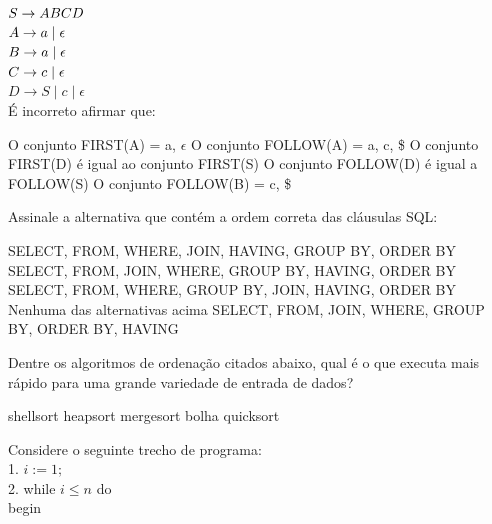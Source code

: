\documentclass[12pt, addpoints]{exam}
\begin{document}
\begin{questions}
$S \rightarrow ABCD \\$\\

$A \rightarrow a \mid \epsilon \\$\\

$B \rightarrow a \mid \epsilon \\$\\

$C \rightarrow c \mid \epsilon \\$\\

$D \rightarrow S \mid c \mid \epsilon$\\



É incorreto afirmar que:
\begin{choices}
\choice O conjunto FIRST(A) = a, \(\epsilon\)
\choice O conjunto FOLLOW(A) = a, c, \$
\choice O conjunto FIRST(D) é igual ao conjunto FIRST(S)
\choice O conjunto FOLLOW(D) é igual a FOLLOW(S)
\choice O conjunto FOLLOW(B) = c, \$
\end{choices}

\question

Assinale a alternativa que contém a ordem correta das cláusulas SQL:


\begin{choices}
\choice SELECT, FROM, WHERE, JOIN, HAVING, GROUP BY, ORDER BY
\choice SELECT, FROM, JOIN, WHERE, GROUP BY, HAVING, ORDER BY
\choice SELECT, FROM, WHERE, GROUP BY, JOIN, HAVING, ORDER BY
\choice Nenhuma das alternativas acima
\choice SELECT, FROM, JOIN, WHERE, GROUP BY, ORDER BY, HAVING
\end{choices}

\question

Dentre os algoritmos de ordenação citados abaixo, qual é o que executa mais rápido para uma grande variedade de entrada de dados? 
\begin{choices}
\choice shellsort
\choice heapsort
\choice mergesort
\choice bolha
\choice quicksort
\end{choices}

\question

Considere o seguinte trecho de programa:\\

1. \( i := 1; \)\\

2. while \( i \leq n \) do\\

   begin\\


\end{questions}
\end{document}
